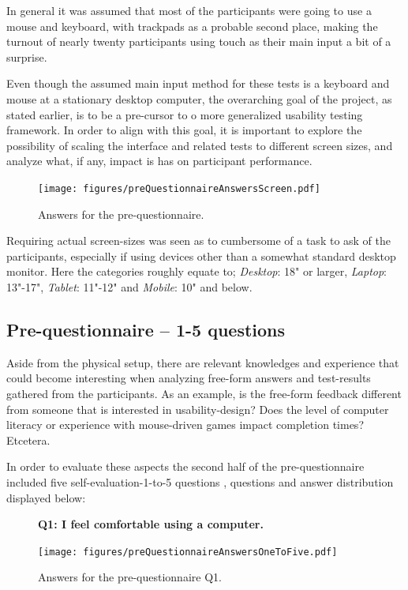 \documentclass[nofilelist,dvipsnames]{cslthse-msc}
\begin{document}
{        In general it was assumed that most of the participants were going to
        use a mouse and keyboard, with trackpads as a probable second place,
        making the turnout of nearly twenty participants using touch as their
        main input a bit of a surprise.

        Even though the assumed main input method for these tests is a keyboard
        and mouse at a stationary desktop computer, the overarching goal of the
        project, as stated earlier, is to be a pre-cursor to o more generalized
        usability testing framework. In order to align with this goal, it is
        important to explore the possibility of scaling the interface and
        related tests to different screen sizes, and analyze what, if any,
        impact is has on participant performance.

				\begin{figure}[h!]
					\centering
					\texttt{[image: figures/preQuestionnaireAnswersScreen.pdf]}
					\caption{Answers for the pre-questionnaire.}
				\end{figure}

        Requiring actual screen-sizes was seen as to cumbersome of a task to
        ask of the participants, especially if using devices other than a
        somewhat standard desktop monitor. Here the categories roughly equate
        to; \textit{Desktop}: 18" or larger, \textit{Laptop}: 13"-17", \textit{Tablet}:
        11"-12" and \textit{Mobile}: 10" and below.

			\subsection{Pre-questionnaire -- 1-5 questions}

        Aside from the physical setup, there are relevant knowledges and
        experience that could become interesting when analyzing free-form
        answers and test-results gathered from the participants. As an example,
        is the free-form feedback different from someone that is interested in
        usability-design? Does the level of computer literacy or experience
        with mouse-driven games impact completion times? Etcetera.

        In order to evaluate these aspects the second half of the
        pre-questionnaire included five self-evaluation-1-to-5 questions
        , questions and answer distribution
        displayed below:

				\begin{figure}[h!]
          \textbf{Q1: I feel comfortable using a computer.}
          \begin{center}
            \texttt{[image: figures/preQuestionnaireAnswersOneToFive.pdf]}
            \vspace{-1cm}
            \caption{Answers for the pre-questionnaire Q1.}
          \end{center}
				\end{figure}

}
\end{document}
